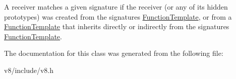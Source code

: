A receiver matches a given signature if the receiver (or any of its hidden prototypes) was created from the signature\textquotesingle{}s \mbox{\hyperlink{classv8_1_1FunctionTemplate}{Function\+Template}}, or from a \mbox{\hyperlink{classv8_1_1FunctionTemplate}{Function\+Template}} that inherits directly or indirectly from the signature\textquotesingle{}s \mbox{\hyperlink{classv8_1_1FunctionTemplate}{Function\+Template}}. 

The documentation for this class was generated from the following file\+:\begin{DoxyCompactItemize}
\item 
v8/include/v8.\+h\end{DoxyCompactItemize}
